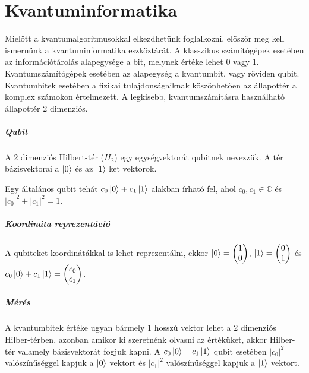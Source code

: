\chapter{Kvantuminformatika}

Mielőtt a kvantumalgoritmusokkal elkezdhetünk foglalkozni, először meg kell
ismernünk a kvantuminformatika eszköztárát. A klasszikus számítógépek esetében
az információtárolás alapegysége a bit, melynek értéke lehet 0 vagy 1.
Kvantumszámítógépek esetében az alapegység a kvantumbit, vagy röviden qubit.
Kvantumbitek esetében a fizikai tulajdonságaiknak köszönhetően az állapottér a
komplex számokon értelmezett. A legkisebb, kvantumszámításra használható
állapottér 2 dimenziós.

\paragraph{Qubit} A 2 dimenziós Hilbert-tér ($H_2$) egy egységvektorát qubitnek
nevezzük. A tér bázisvektorai a $\ket{0}$ és az $\ket{1}$ ket vektorok.

Egy általános qubit tehát $c_0\ket{0} + c_1\ket{1}$ alakban írható fel, ahol
$c_0, c_1 \in{} \mathds{C}$ és $|c_0|^2 + |c_1|^2 = 1$.

\paragraph{Koordináta reprezentáció} A qubiteket koordinátákkal is lehet
reprezentálni, ekkor $\ket{0} = \begin{pmatrix} 1 \\ 0 \end{pmatrix}$, $\ket{1}
  = \begin{pmatrix} 0 \\ 1 \end{pmatrix}$ és $c_0\ket{0} + c_1\ket{1} =
  \begin{pmatrix} c_0 \\ c_1 \end{pmatrix}$.

\paragraph{Mérés} A kvantumbitek értéke ugyan bármely 1 hosszú vektor lehet a 2
dimenziós Hilber-térben, azonban amikor ki szeretnénk olvasni az értéküket,
akkor Hilber-tér valamely bázisvektorát fogjuk kapni. A $c_0\ket{0} +
  c_1\ket{1}$ qubit esetében $|c_0|^2$ valószínűséggel kapjuk a $\ket{0}$ vektort
és $|c_1|^2$ valószínűséggel kapjuk a $\ket{1}$ vektort.

